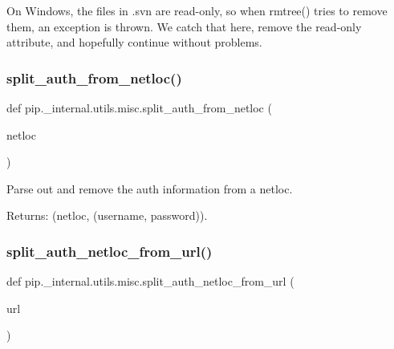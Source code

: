 \begin{DoxyVerb}On Windows, the files in .svn are read-only, so when rmtree() tries to
remove them, an exception is thrown.  We catch that here, remove the
read-only attribute, and hopefully continue without problems.\end{DoxyVerb}
 \mbox{\label{namespacepip_1_1__internal_1_1utils_1_1misc_a4f7ed628264a14243cddbdbddf4b36e8}} 
\subsubsection{\texorpdfstring{split\+\_\+auth\+\_\+from\+\_\+netloc()}{split\_auth\_from\_netloc()}}
{\footnotesize\ttfamily def pip.\+\_\+internal.\+utils.\+misc.\+split\+\_\+auth\+\_\+from\+\_\+netloc (\begin{DoxyParamCaption}\item[{}]{netloc }\end{DoxyParamCaption})}

\begin{DoxyVerb}Parse out and remove the auth information from a netloc.

Returns: (netloc, (username, password)).
\end{DoxyVerb}
 \mbox{\label{namespacepip_1_1__internal_1_1utils_1_1misc_ac00e7e8295d8c5fd6e30534a3ef457ca}} 
\subsubsection{\texorpdfstring{split\+\_\+auth\+\_\+netloc\+\_\+from\+\_\+url()}{split\_auth\_netloc\_from\_url()}}
{\footnotesize\ttfamily def pip.\+\_\+internal.\+utils.\+misc.\+split\+\_\+auth\+\_\+netloc\+\_\+from\+\_\+url (\begin{DoxyParamCaption}\item[{}]{url }\end{DoxyParamCaption})}

